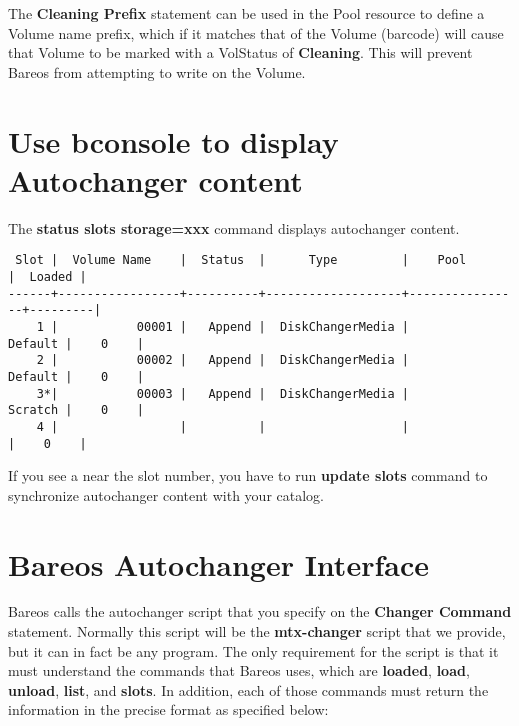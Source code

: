 The {\bf Cleaning Prefix} statement can be used in the Pool resource to define
a Volume name prefix, which if it matches that of the Volume (barcode) will
cause that Volume to be marked with a VolStatus of {\bf Cleaning}. This will
prevent Bareos from attempting to write on the Volume.

\section{Use bconsole to display Autochanger content}

The {\bf status slots storage=xxx} command displays autochanger content.

\footnotesize
\begin{verbatim}
 Slot |  Volume Name    |  Status  |      Type         |    Pool        |  Loaded |
------+-----------------+----------+-------------------+----------------+---------|
    1 |           00001 |   Append |  DiskChangerMedia |        Default |    0    |
    2 |           00002 |   Append |  DiskChangerMedia |        Default |    0    |
    3*|           00003 |   Append |  DiskChangerMedia |        Scratch |    0    |
    4 |                 |          |                   |                |    0    |
\end{verbatim}
\normalsize

If you see a {\bf *} near the slot number, you have to run {\bf update slots}
command to synchronize autochanger content with your catalog.



\section{Bareos Autochanger Interface}
\label{autochanger-interface}

Bareos calls the autochanger script that you specify on the {\bf Changer
Command} statement. Normally this script will be the {\bf mtx-changer} script
that we provide, but it can in fact be any program. The only requirement
for the script is that it must understand the commands that
Bareos uses, which are {\bf loaded}, {\bf load}, {\bf
unload}, {\bf list}, and {\bf slots}. In addition,
each of those commands must return the information in the precise format as
specified below:

